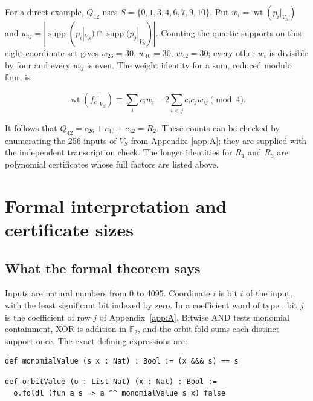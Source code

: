 \documentclass[pdflatex,sn-mathphys-num]{sn-jnl}
\begin{document}
For a direct example, $Q_{42}$ uses $S=\{0,1,3,4,6,7,9,10\}$. Put $w_i=\operatorname{wt}(p_i|_{V_S})$ and $w_{ij}=|\operatorname{supp}(p_i|_{V_S})\cap\operatorname{supp}(p_j|_{V_S})|$. Counting the quartic supports on this eight-coordinate set gives $w_{26}=30$, $w_{40}=30$, $w_{42}=30$; every other $w_i$ is divisible by four and every $w_{ij}$ is even. The weight identity for a sum, reduced modulo four, is

\[
\operatorname{wt}(f_c|_{V_S})\equiv\sum_i c_iw_i-2\sum_{i<j}c_ic_jw_{ij}\pmod4.
\]

It follows that $Q_{42}=c_{26}+c_{40}+c_{42}=R_2$. These counts can be checked by enumerating the 256 inputs of $V_S$ from Appendix~\ref{app:A}; they are supplied with the independent transcription check. The longer identities for $R_1$ and $R_3$ are polynomial certificates whose full factors are listed above.

\section{Formal interpretation and certificate sizes}\label{app:C}

\subsection{What the formal theorem says}\label{subsec:C:1}

Inputs are natural numbers from 0 to 4095. Coordinate $i$ is bit $i$ of the input, with the least significant bit indexed by zero. In a coefficient word of type , bit $j$ is the coefficient of row $j$ of Appendix~\ref{app:A}. Bitwise AND tests monomial containment, XOR is addition in $\mathbb F_2$, and the orbit fold sums each distinct support once. The exact defining expressions are:

\begin{Verbatim}[fontsize=\scriptsize,breaklines=true,breakanywhere=true,commandchars=\\\{\}]
def monomialValue (s x : Nat) : Bool := (x &&& s) == s
\end{Verbatim}

\begin{Verbatim}[fontsize=\scriptsize,breaklines=true,breakanywhere=true,commandchars=\\\{\}]
def orbitValue (o : List Nat) (x : Nat) : Bool :=
  o.foldl (fun a s => a ^^ monomialValue s x) false
\end{Verbatim}
\end{document}
